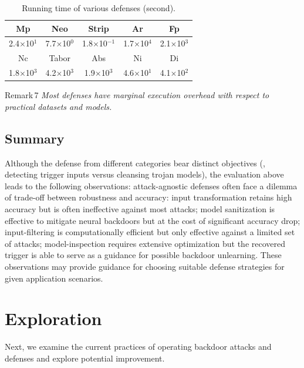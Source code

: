 \documentclass[compsoc,conference,a4paper,10pt,times]{IEEEtran}
\newcommand{\nc}{{\sc Nc}\xspace}
\newcommand{\ninspect}{{\sc Ni}\xspace}
\newcommand{\abs}{{\sc Abs}\xspace}
\newcommand{\tabor}{{\sc Tabor}\xspace}
\newcommand{\strip}{{\sc Strip}\xspace}
\newcommand{\di}{{\sc Di}\xspace}
\newcommand{\fp}{{\sc Fp}\xspace}
\newcommand{\at}{{\sc Ar}\xspace}
\newcommand{\neo}{{\sc Neo}\xspace}
\newcommand{\mmp}{{\sc Mp}\xspace}
\begin{document}
\begin{table}[!ht]{\footnotesize
    \centering
    \renewcommand{\arraystretch}{1.2}
    \setlength{\tabcolsep}{3pt}
    \begin{tabular}{c|c|c|c|c}
   \mmp &  \neo  & \strip &  \at &  \fp \\
   \hline
  2.4$\times$10$^1$  &   7.7$\times$10$^0$    &   1.8$\times$10$^{-1}$  &  1.7$\times$10$^4$  & 2.1$\times$10$^3$ \\
  \hline
  \hline

   \nc & \tabor & \abs & \ninspect & \di  \\
   \hline
 1.8$\times$10$^3$ & 4.2$\times$10$^3$  & 1.9$\times$10$^3$ & 4.6$\times$10$^1$ & 4.1$\times$10$^2$  
    \end{tabular}
    \caption{\footnotesize Running time of various defenses (second). \label{tab:time}}}
\end{table}

\begin{mtbox}{\small Remark\,7}
{\em \small Most defenses have marginal execution overhead with respect to practical datasets and models.}
\end{mtbox}

\subsection{Summary}
Although the defense from different categories bear distinct objectives (\meg, detecting trigger inputs versus cleansing trojan models), the evaluation above leads to the following observations:   attack-agnostic defenses often face a dilemma of trade-off between robustness and accuracy: input transformation retains high accuracy but is often ineffective against most attacks; model sanitization is 
effective to mitigate neural backdoors but at the cost of significant accuracy drop;  input-filtering is computationally efficient but only effective against a limited set of attacks;  model-inspection requires extensive optimization but the recovered trigger is able to serve as a guidance for possible backdoor unlearning. These observations may provide guidance for choosing suitable defense strategies for given application scenarios.

\section{Exploration}
\label{sec:exploration}

Next, we examine the current practices of operating backdoor attacks and defenses and explore potential improvement. 
\end{document}
